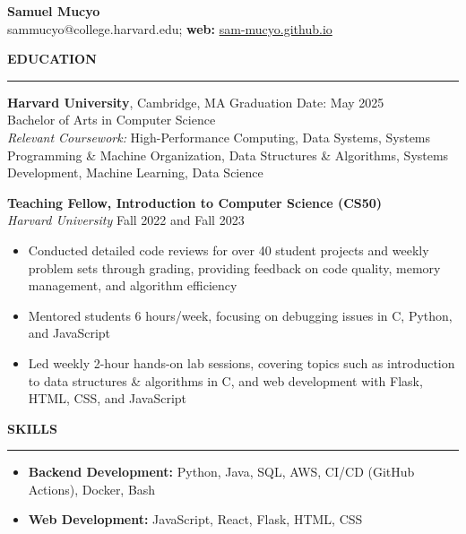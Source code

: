 \documentclass[11pt,a4paper]{article}
\newcommand{\sectionheading}[1]{\vspace{0.2cm}\textbf{\Large #1}\vspace{0.1cm}\hrule\vspace{0.3cm}}
\newcommand{\subheading}[1]{\textbf{#1}}
\newcommand{\daterange}[1]{\hfill{#1}}
\begin{document}
\begin{center}
    \textbf{\LARGE Samuel Mucyo}\\
    \vspace{0.3cm}
    sammucyo@college.harvard.edu; \textbf{web:} \href{https://sam-mucyo.github.io/}{sam-mucyo.github.io} \\
\end{center}


\sectionheading{EDUCATION}
\subheading{Harvard University}, Cambridge, MA \daterange{Graduation Date: May 2025}\\
Bachelor of Arts in Computer Science\\
\textit{Relevant Coursework:} High-Performance Computing, Data Systems, Systems Programming \& Machine Organization, Data Structures \& Algorithms, Systems Development, Machine Learning, Data Science

\subheading{Teaching Fellow, Introduction to Computer Science (CS50)}\\
\textit{Harvard University} \daterange{Fall 2022 and Fall 2023}
\begin{itemize}[leftmargin=*,nosep]
    \item Conducted detailed code reviews for over 40 student projects and weekly problem sets through grading, providing feedback on code quality, memory management, and algorithm efficiency
    \item Mentored students 6 hours/week, focusing on debugging issues in C, Python, and JavaScript
    \item Led weekly 2-hour hands-on lab sessions, covering topics such as introduction to data structures \& algorithms in C, and web development with Flask, HTML, CSS, and JavaScript
\end{itemize}

\sectionheading{SKILLS}
\begin{itemize}[leftmargin=*,nosep]
    \item \textbf{Backend Development:} Python, Java, SQL, AWS, CI/CD (GitHub Actions), Docker, Bash
    \item \textbf{Web Development:} JavaScript, React, Flask, HTML, CSS
\end{itemize}
\end{document}
